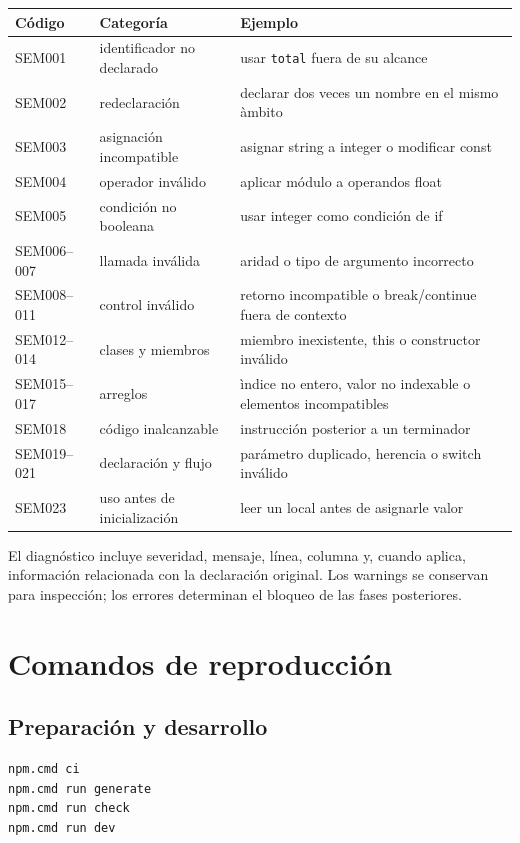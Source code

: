 \documentclass[11pt,letterpaper,oneside]{report}
\newcommand{\codigo}[1]{\texttt{#1}}
\begin{document}
\begin{longtable}{p{2cm}p{4.8cm}p{6.2cm}}
\toprule
C\'odigo & Categor\'ia & Ejemplo\\\midrule
\endhead
SEM001 & identificador no declarado & usar \codigo{total} fuera de su alcance\\
SEM002 & redeclaraci\'on & declarar dos veces un nombre en el mismo \`ambito\\
SEM003 & asignaci\'on incompatible & asignar string a integer o modificar const\\
SEM004 & operador inv\'alido & aplicar m\'odulo a operandos float\\
SEM005 & condici\'on no booleana & usar integer como condici\'on de if\\
SEM006--007 & llamada inv\'alida & aridad o tipo de argumento incorrecto\\
SEM008--011 & control inv\'alido & retorno incompatible o break/continue fuera de contexto\\
SEM012--014 & clases y miembros & miembro inexistente, this o constructor inv\'alido\\
SEM015--017 & arreglos & \`indice no entero, valor no indexable o elementos incompatibles\\
SEM018 & c\'odigo inalcanzable & instrucci\'on posterior a un terminador\\
SEM019--021 & declaraci\'on y flujo & par\'ametro duplicado, herencia o switch inv\'alido\\
SEM023 & uso antes de inicializaci\'on & leer un local antes de asignarle valor\\
\bottomrule
\end{longtable}

El diagn\'ostico incluye severidad, mensaje, l\'inea, columna y, cuando aplica, informaci\'on relacionada con la declaraci\'on original. Los warnings se conservan para inspecci\'on; los errores determinan el bloqueo de las fases posteriores.

\chapter{Comandos de reproducci\'on}

\section{Preparaci\'on y desarrollo}

\begin{verbatim}
npm.cmd ci
npm.cmd run generate
npm.cmd run check
npm.cmd run dev
\end{verbatim}
\end{document}
